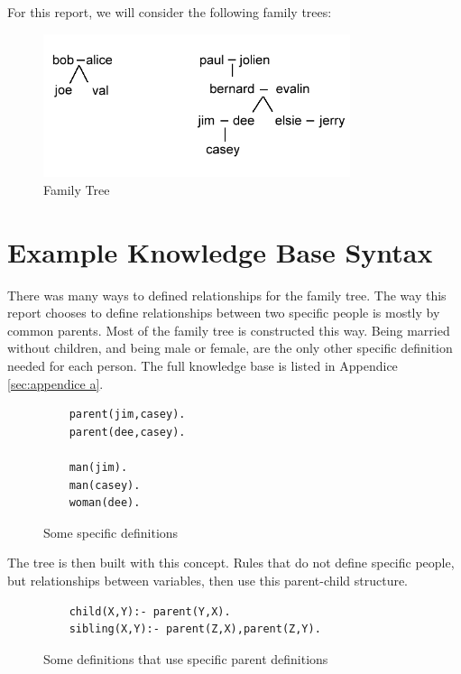 \documentclass[12pt]{article}
\begin{document}
For this report, we will consider the following family trees:
\begin{figure}[!h]
        \begin{center}
                \includegraphics[width=90mm]{images/fam_tree.png}
                \caption{Family Tree}
                \label{fam_tree}
        \end{center}
\end{figure}



\section{Example Knowledge Base Syntax}
There was many ways to defined relationships for the family tree. The way this report chooses to define relationships between two specific people is mostly by common parents. Most of the family tree is 
constructed this way. Being married without children, and being male or female, are the only other specific 
definition needed for each person. The full knowledge base is listed in Appendice \ref{sec:appendice a}.

\begin{figure}[h]
 \begin{lstlisting}
	parent(jim,casey).
	parent(dee,casey).

	man(jim).
	man(casey).
	woman(dee).
 \end{lstlisting}
\caption{Some specific definitions}
\label{spec}
\end{figure}

The tree is then built with this concept. Rules that do not define specific people, but relationships between 
variables, then use this parent-child structure. 

\begin{figure}[h]
 \begin{lstlisting}
	child(X,Y):- parent(Y,X).
	sibling(X,Y):- parent(Z,X),parent(Z,Y).
 \end{lstlisting}
\caption{Some definitions that use specific parent definitions}
\label{child}
\end{figure}
\end{document}
